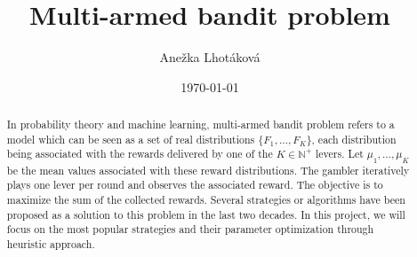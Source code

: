 \documentclass[11pt,american,czech]{article}
\newcommand{\N}{\mathbb{N}} %
\begin{document}
	\title{Multi-armed bandit problem}
	\author{Anežka Lhotáková}
	\date{\today}
	\maketitle
	\begin{abstract}
		In probability theory and machine learning, multi-armed bandit problem refers to a model which can be seen as a set of real distributions $\{F_1,\dots,F_K\}$, each distribution being associated with the rewards delivered by one of the $K\in\N^+$ levers. Let $\mu_1,\dots,\mu_K$ be the mean values associated with these reward distributions. The gambler iteratively plays one lever per round and observes the associated reward. The objective is to maximize the sum of the collected rewards. Several strategies or algorithms have been proposed as a solution to this problem in the last two decades. In this project, we will focus on the most popular strategies and their parameter optimization through heuristic approach.
	\end{abstract}
\end{document}
